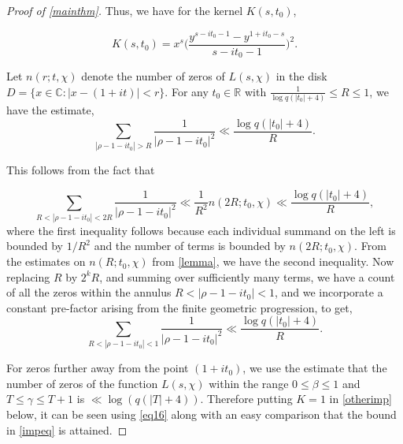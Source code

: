 \documentclass[letter,12pt]{article}
\newcounter{lem}
\theoremstyle{plain}
\theoremstyle{definition}
\theoremstyle{plain}
\begin{document}
\begin{proof}[Proof of \cref{mainthm}]
\noindent Thus, we have for the kernel $K(s,t_0)$,

\begin{equation}
K(s,t_0)=x^{s}\Big(\frac{y^{s-it_0 -1}- y^{1+it_0 -s}}{s-it_0 -1}\Big)^{2}.
\end{equation}


\bigskip 

 Let $n(r;t,\chi)$ denote the number of zeros of $L(s,\chi)$ in the disk $D= \{x\in \mathbb{C}:|x-(1+it)|<r\}$. For any $t_0 \in \mathbb{R}$ with $\frac{1}{\log q(|t_0|+4)}\leq R \leq 1$, we have the estimate,
\begin{equation}\label{impeq}
    \sum\limits_{|\rho -1-it_0|>R} \frac{1}{|\rho- 1-it_0|^{2}} \ll \frac{\log q(|t_0|+4)}{R}.
\end{equation}

\noindent This follows from the fact that 

\begin{equation}
    \sum\limits_{R<|\rho -1-it_0|<2R} \frac{1}{|\rho -1-it_0|^{2}} \ll \frac{1}{R^{2}} n(2R;t_0,\chi) \ll \frac{\log q(|t_0|+4)}{R},
\end{equation}
where the first inequality follows because each individual summand on the left is bounded by $1/R^{2}$ and the number of terms is bounded by $n(2R;t_0,\chi)$. From the estimates on $n(R;t_0,\chi)$ from \cref{lemma}, %
we have the second inequality. Now replacing $R$ by $2^{k}R$, and summing over sufficiently many terms, we have a count of all the zeros within the annulus $R<|\rho -1-it_0|<1$, and we incorporate a constant pre-factor arising from the finite geometric progression, to get,
\begin{equation}\label{eq16}
    \sum\limits_{R<|\rho -1-it_0|<1} \frac{1}{
    |\rho -1-it_0|^{2}}\ll \frac{\log q(|t_0|+4)}{R}.
\end{equation}

For zeros further away from the point $(1+it_0)$, we use the estimate that the number of zeros of the function $L(s,\chi)$ within the range $0\leq \beta \leq 1$ and $T\leq \gamma \leq T+1$ is $\ll \log (q(|T|+4))$. Therefore putting $K=1$ in \cref{otherimp} below, it can be seen using \cref{eq16} along with an easy comparison that the bound in \cref{impeq} is attained. 


\end{proof}
\end{document}
